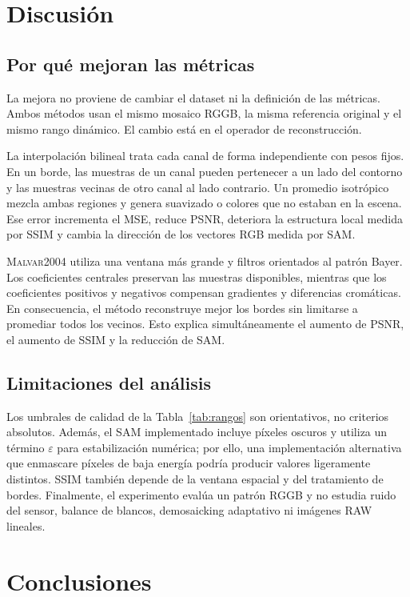 \documentclass[11pt,a4paper]{article}
\newcommand{\malvar}{\textsc{Malvar2004}}
\begin{document}
\section{Discusión}

\subsection{Por qué mejoran las métricas}

La mejora no proviene de cambiar el dataset ni la definición de las métricas. Ambos métodos usan el mismo mosaico RGGB, la misma referencia original y el mismo rango dinámico. El cambio está en el operador de reconstrucción.

La interpolación bilineal trata cada canal de forma independiente con pesos fijos. En un borde, las muestras de un canal pueden pertenecer a un lado del contorno y las muestras vecinas de otro canal al lado contrario. Un promedio isotrópico mezcla ambas regiones y genera suavizado o colores que no estaban en la escena. Ese error incrementa el MSE, reduce PSNR, deteriora la estructura local medida por SSIM y cambia la dirección de los vectores RGB medida por SAM.

\malvar{} utiliza una ventana más grande y filtros orientados al patrón Bayer. Los coeficientes centrales preservan las muestras disponibles, mientras que los coeficientes positivos y negativos compensan gradientes y diferencias cromáticas. En consecuencia, el método reconstruye mejor los bordes sin limitarse a promediar todos los vecinos. Esto explica simultáneamente el aumento de PSNR, el aumento de SSIM y la reducción de SAM.

\subsection{Limitaciones del análisis}

Los umbrales de calidad de la Tabla~\ref{tab:rangos} son orientativos, no criterios absolutos. Además, el SAM implementado incluye píxeles oscuros y utiliza un término $\varepsilon$ para estabilización numérica; por ello, una implementación alternativa que enmascare píxeles de baja energía podría producir valores ligeramente distintos. SSIM también depende de la ventana espacial y del tratamiento de bordes. Finalmente, el experimento evalúa un patrón RGGB y no estudia ruido del sensor, balance de blancos, demosaicking adaptativo ni imágenes RAW lineales.

\section{Conclusiones}
\end{document}
